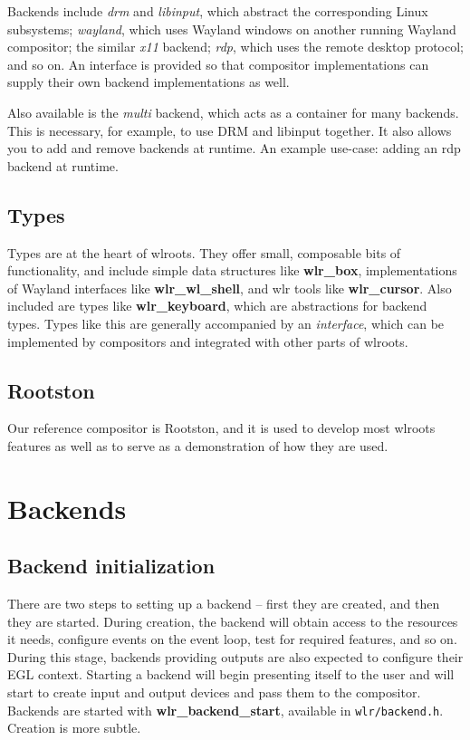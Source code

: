 \documentclass{article}
\newcommand{\code}[1]{\texttt{#1}}
\begin{document}
Backends include \emph{drm} and \emph{libinput}, which abstract the
corresponding Linux subsystems; \emph{wayland}, which uses Wayland windows on
another running Wayland compositor; the similar \emph{x11} backend; \emph{rdp},
which uses the remote desktop protocol; and so on. An interface is provided so
that compositor implementations can supply their own backend implementations as
well.

Also available is the \emph{multi} backend, which acts as a container for many
backends. This is necessary, for example, to use DRM and libinput together. It
also allows you to add and remove backends at runtime. An example use-case:
adding an rdp backend at runtime.

\subsection{Types}\label{high level types}

Types are at the heart of wlroots. They offer small, composable bits of
functionality, and include simple data structures like \textbf{wlr_box},
implementations of Wayland interfaces like \textbf{wlr_wl_shell}, and wlr tools
like \textbf{wlr_cursor}. Also included are types like \textbf{wlr_keyboard},
which are abstractions for backend types. Types like this are generally
accompanied by an \emph{interface}, which can be implemented by compositors and
integrated with other parts of wlroots.

\subsection{Rootston}\label{rootston}

Our reference compositor is Rootston, and it is used to develop most wlroots
features as well as to serve as a demonstration of how they are used.

\newpage
\section{Backends}\label{backends}

\subsection{Backend initialization}\label{backend init}

There are two steps to setting up a backend -- first they are created, and then
they are started. During creation, the backend will obtain access to the
resources it needs, configure events on the event loop, test for required
features, and so on. During this stage, backends providing outputs are also
expected to configure their EGL context. Starting a backend will begin
presenting itself to the user and will start to create input and output devices
and pass them to the compositor. Backends are started with
\textbf{wlr_backend_start}, available in \code{wlr/backend.h}. Creation is more
subtle.
\end{document}

